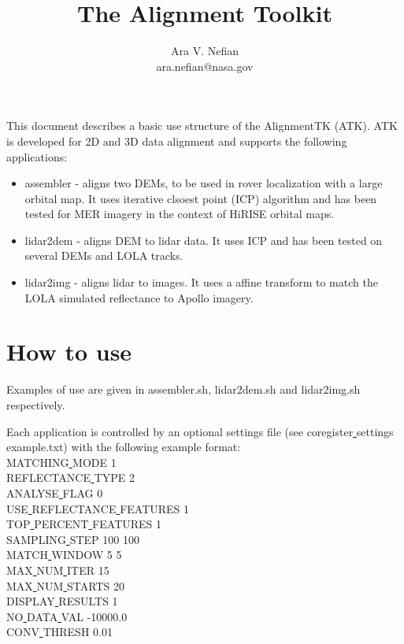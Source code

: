 \documentclass[12pt]{article}
\begin{document}
\title {The Alignment Toolkit}
\author{Ara V. Nefian\\
ara.nefian@nasa.gov}
\maketitle

This document describes a basic use structure of the AlignmentTK (ATK). ATK is developed for 2D and 3D data alignment and supports the 
following applications:
\begin{itemize}
\item assembler - aligns two DEMs, to be used in rover localization with a large orbital map. It uses iterative clsoest point (ICP) algorithm and has 
been tested for MER imagery in the context of HiRISE orbital maps.
\item lidar2dem - aligns DEM to lidar data. It uses ICP and has been tested on several DEMs and LOLA tracks.
\item lidar2img - aligns lidar to images. It uses a affine transform to match the LOLA simulated reflectance to Apollo imagery. 
\end{itemize} 

\section{How to use}
Examples of use are given in assembler.sh, lidar2dem.sh and lidar2img.sh respectively.

Each application is controlled by an optional settings file (see coregister\underline{ }settings\underline{ }example.txt) with the following example format:\\
MATCHING\underline{ }MODE 1\\
REFLECTANCE\underline{ }TYPE 2\\
ANALYSE\underline{ }FLAG 0\\
USE\underline{ }REFLECTANCE\underline{ }FEATURES 1\\
TOP\underline{ }PERCENT\underline{ }FEATURES 1\\
SAMPLING\underline{ }STEP 100 100\\
MATCH\underline{ }WINDOW 5 5\\
MAX\underline{ }NUM\underline{ }ITER 15\\
MAX\underline{ }NUM\underline{ }STARTS 20\\
DISPLAY\underline{ }RESULTS 1\\
NO\underline{ }DATA\underline{ }VAL -10000.0\\
CONV\underline{ }THRESH 0.01\\
\end{document}
